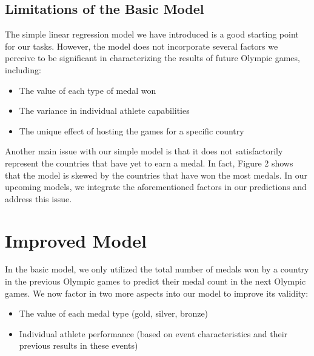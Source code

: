 \documentclass{mcmthesis}
\begin{document}
\subsection{Limitations of the Basic Model}
The simple linear regression model we have introduced is a good starting point for our tasks. However, the model does not incorporate several factors we perceive to be significant in characterizing the results of future Olympic games, including:
\begin{itemize}
    \item The value of each type of medal won
    \item The variance in individual athlete capabilities
    \item The unique effect of hosting the games for a specific country
\end{itemize} \par
Another main issue with our simple model is that it does not satisfactorily represent the countries that have yet to earn a medal. In fact, Figure 2 shows that the model is skewed by the countries that have won the most medals. In our upcoming models, we integrate the aforementioned factors in our predictions and address this issue. 
\newpage
\section{Improved Model}
In the basic model, we only utilized the total number of medals won by a country in the previous Olympic games to predict their medal count in the next Olympic games. We now factor in two more aspects into our model to improve its validity:
\begin{itemize}
    \item The value of each medal type (gold, silver, bronze)
    \item Individual athlete performance (based on event characteristics and their previous results in these events)
\end{itemize}
\end{document}
